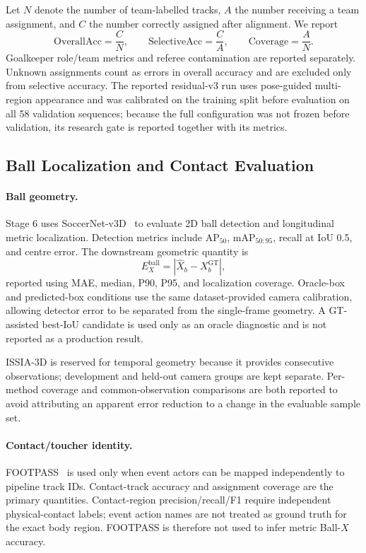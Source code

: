 \documentclass[runningheads]{llncs}
\begin{document}
Let $N$ denote the number of team-labelled tracks, $A$ the number receiving a team assignment, and $C$ the number correctly assigned after alignment. We report
\begin{equation}
\mathrm{OverallAcc}=\frac{C}{N},\qquad
\mathrm{SelectiveAcc}=\frac{C}{A},\qquad
\mathrm{Coverage}=\frac{A}{N}.
\end{equation}
Goalkeeper role/team metrics and referee contamination are reported separately. Unknown assignments count as errors in overall accuracy and are excluded only from selective accuracy. The reported residual-v3 run uses pose-guided multi-region appearance and was calibrated on the training split before evaluation on all 58 validation sequences; because the full configuration was not frozen before validation, its research gate is reported together with its metrics.

\subsection{Ball Localization and Contact Evaluation}
\label{subsec:ball_eval}
\paragraph{Ball geometry.}
Stage 6 uses SoccerNet-v3D~\cite{snv3d} to evaluate 2D ball detection and longitudinal metric localization. Detection metrics include AP$_{50}$, mAP$_{50:95}$, recall at IoU 0.5, and centre error. The downstream geometric quantity is
\begin{equation}
E_X^{\mathrm{ball}}=|\widehat X_b-X_b^{\mathrm{GT}}|,
\end{equation}
reported using MAE, median, P90, P95, and localization coverage. Oracle-box and predicted-box conditions use the same dataset-provided camera calibration, allowing detector error to be separated from the single-frame geometry. A GT-assisted best-IoU candidate is used only as an oracle diagnostic and is not reported as a production result.

ISSIA-3D is reserved for temporal geometry because it provides consecutive observations; development and held-out camera groups are kept separate. Per-method coverage and common-observation comparisons are both reported to avoid attributing an apparent error reduction to a change in the evaluable sample set.

\paragraph{Contact/toucher identity.}
FOOTPASS~\cite{footpass} is used only when event actors can be mapped independently to pipeline track IDs. Contact-track accuracy and assignment coverage are the primary quantities. Contact-region precision/recall/F1 require independent physical-contact labels; event action names are not treated as ground truth for the exact body region. FOOTPASS is therefore not used to infer metric Ball-$X$ accuracy.
\end{document}
